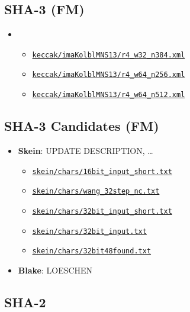 \documentclass[11pt, a4paper]{article}
\newcommand{\hashlink}[2][black]{\href{https://extgit.iaik.tugraz.at/krypto/nldtool/blob/master/hash/#2}{\color{#1}\nolinkurl{#2}}}
\begin{document}
\subsection{SHA-3 (FM)}

\begin{itemize}
  \item {}
    \begin{itemize}
      \item \hashlink[todo]{keccak/imaKolblMNS13/r4_w32_n384.xml}
      \item \hashlink[todo]{keccak/imaKolblMNS13/r4_w64_n256.xml}
      \item \hashlink[todo]{keccak/imaKolblMNS13/r4_w64_n512.xml}
    \end{itemize}
\end{itemize}

\subsection{SHA-3 Candidates (FM)}

\begin{itemize}
  \item \textbf{Skein}: UPDATE DESCRIPTION, \dots
    \begin{itemize}
      \item \hashlink[todo]{skein/chars/16bit_input_short.txt}
      \item \hashlink[todo]{skein/chars/wang_32step_nc.txt}
      \item \hashlink[todo]{skein/chars/32bit_input_short.txt}
      \item \hashlink[todo]{skein/chars/32bit_input.txt}
      \item \hashlink[todo]{skein/chars/32bit48found.txt}
    \end{itemize}
  \item \textbf{Blake}: LOESCHEN
\end{itemize}

\subsection{SHA-2}
\end{document}
